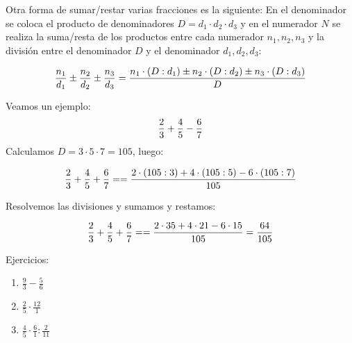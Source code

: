Otra forma de sumar/restar varias fracciones es la siguiente: En el denominador se coloca el producto de denominadores $D=d_1\cdot d_2 \cdot d_3$ y en el numerador $N$ se realiza la suma/resta de los productos entre cada numerador $n_1, n_2, n_3$ y la división entre el denominador $D$ y el denominador $d_1, d_2, d_3$:

\begin{equation}
    \notag
    \frac{n_1}{d_1}\pm\frac{n_2}{d_2}\pm\frac{n_3}{d_3}=\frac{n_1\cdot (D:d_1) \pm n_2\cdot (D:d_2)\pm n_3\cdot (D:d_3) }{D}   
\end{equation}

\medskip
Veamos un ejemplo:
\begin{equation}
     \notag
    \frac{2}{3}+\frac{4}{5}-\frac{6}{7}  
\end{equation}
Calculamos $D = 3\cdot 5 \cdot 7 = 105$, luego:

\begin{equation}
     \notag
    \frac{2}{3}+\frac{4}{5}+\frac{6}{7} =  =\frac{2\cdot (105:3) + 4\cdot (105:5)- 6\cdot (105:7) }{105}
\end{equation}

Resolvemos las divisiones y sumamos y restamos:

\begin{equation}
     \notag
    \frac{2}{3}+\frac{4}{5}+\frac{6}{7} =  =\frac{2\cdot 35 + 4\cdot 21- 6\cdot 15 }{105} = \frac{64}{105}
\end{equation}

Ejercicios:\\

\begin{enumerate}
\renewcommand{\labelenumi}{{\theenumi})}
\item $\frac{9}{3}-\frac{5}{6}$
\item $\frac{2}{5}\cdot \frac{12}{1}$
\item $\frac{4}{5}\cdot \frac{6}{1} : \frac{2}{11}$

\end{enumerate}
